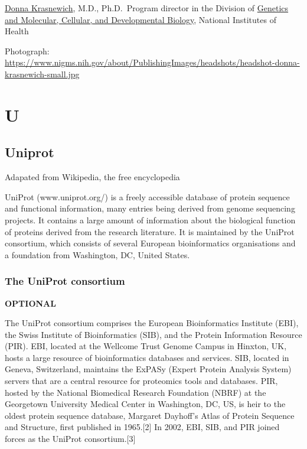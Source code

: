\documentclass[
]{book}
\begin{document}
\href{https://www.nigms.nih.gov/about/Pages/krasnewich.aspx}{Donna Krasnewich}, M.D., Ph.D.~Program director in the Division of \href{https://www.nigms.nih.gov/about/overview/Pages/GMCDB.aspx}{Genetics and Molecular, Cellular, and Developmental Biology}, National Institutes of Health

Photograph: \url{https://www.nigms.nih.gov/about/PublishingImages/headshots/headshot-donna-krasnewich-small.jpg}

\hypertarget{u}{%
\chapter{U}\label{u}}

\hypertarget{uniprot}{%
\section{Uniprot}\label{uniprot}}

Adapated from Wikipedia, the free encyclopedia

UniProt (www.uniprot.org/) is a freely accessible database of protein sequence and functional information, many entries being derived from genome sequencing projects. It contains a large amount of information about the biological function of proteins derived from the research literature. It is maintained by the UniProt consortium, which consists of several European bioinformatics organisations and a foundation from Washington, DC, United States.

\hypertarget{the-uniprot-consortium}{%
\subsection{The UniProt consortium}\label{the-uniprot-consortium}}

\textbf{OPTIONAL}

The UniProt consortium comprises the European Bioinformatics Institute (EBI), the Swiss Institute of Bioinformatics (SIB), and the Protein Information Resource (PIR). EBI, located at the Wellcome Trust Genome Campus in Hinxton, UK, hosts a large resource of bioinformatics databases and services. SIB, located in Geneva, Switzerland, maintains the ExPASy (Expert Protein Analysis System) servers that are a central resource for proteomics tools and databases. PIR, hosted by the National Biomedical Research Foundation (NBRF) at the Georgetown University Medical Center in Washington, DC, US, is heir to the oldest protein sequence database, Margaret Dayhoff's Atlas of Protein Sequence and Structure, first published in 1965.{[}2{]} In 2002, EBI, SIB, and PIR joined forces as the UniProt consortium.{[}3{]}
\end{document}

